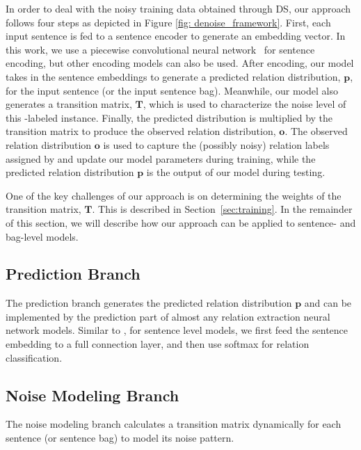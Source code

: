 In order to deal with the noisy training data obtained through DS, our approach follows four steps as depicted in Figure \ref{fig: denoise_framework}.
First, each input sentence is fed to a sentence encoder to generate an embedding vector. In this work, we
use a piecewise convolutional neural network~\cite{zeng2015distant} for sentence encoding, but other encoding models can also be
used. After encoding, our model takes in the sentence embeddings to generate a predicted relation
distribution, $\mathbf{p}$, for the input sentence (or the input sentence bag). Meanwhile, our model also generates a transition matrix,
$\mathbf{T}$, which is used to characterize the noise level of this \DS-labeled instance. Finally, the predicted distribution is
multiplied by the transition matrix to produce the observed relation distribution, $\mathbf{o}$. The observed relation distribution $\mathbf{o}$ is used to capture the (possibly noisy) relation labels assigned by \DS and update our model parameters during training, while the predicted relation distribution $\mathbf{p}$ is the output of our model during testing. 


One of the key challenges of our approach is
on determining the weights of the transition matrix, $\mathbf{T}$. This is described in Section~\ref{sec:training}.
In the remainder of this section, we will describe how our approach can be
applied to sentence- and bag-level models. 



\subsection{Prediction Branch}
The prediction branch generates the predicted relation distribution $\mathbf{p}$ and can be implemented by the
prediction part of almost any relation extraction neural network models. Similar to \cite{luo2016temporal}, for
sentence level models, we first feed the sentence embedding to a full connection layer, and then use softmax for
relation classification.

\subsection{Noise Modeling Branch}
The noise modeling branch calculates a transition matrix dynamically for each sentence (or sentence bag) to model its noise pattern.

